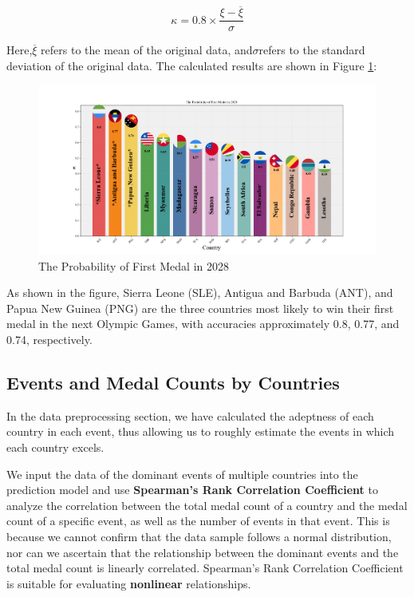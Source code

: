 \documentclass[12pt]{article}  %
\begin{document}
\begin{equation}
	\kappa = 0.8 \times \frac{\xi - \overline{\xi}}{\sigma}
\end{equation}

Here,$\overline{\xi}$ refers to the mean of the original data, and$\sigma$refers to the standard deviation of the original data.
The calculated results are shown in Figure \ref{fig:First Medal}:
\begin{figure}[H]
	\centering
	\includegraphics[width=16cm]{img/First.png}
	\caption{The Probability of First Medal in 2028}
	\label{fig:First Medal}
\end{figure}


As shown in the figure, Sierra Leone (SLE), Antigua and Barbuda (ANT), and Papua New Guinea (PNG) are the three countries most likely to win their first medal in the next Olympic Games, with accuracies approximately 0.8, 0.77, and 0.74, respectively.


\subsection{Events and Medal Counts by Countries}
In the data preprocessing section, we have calculated the adeptness of each country in each event, thus allowing us to roughly estimate the events in which each country excels.

We input the data of the dominant events of multiple countries into the prediction model and use \textbf{Spearman's Rank Correlation Coefficient} to analyze the correlation between the total medal count of a country and the medal count of a specific event, as well as the number of events in that event. This is because we cannot confirm that the data sample follows a normal distribution, nor can we ascertain that the relationship between the dominant events and the total medal count is linearly correlated. Spearman's Rank Correlation Coefficient is suitable for evaluating \textbf{nonlinear} relationships.
\end{document}
